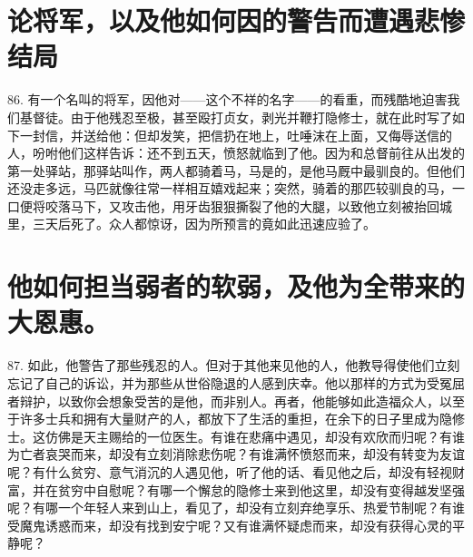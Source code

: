 
\section{论将军，以及他如何因的警告而遭遇悲惨结局}

86. 有一个名叫的将军，因他对——这个不祥的名字——的看重，而残酷地迫害我们基督徒。由于他残忍至极，甚至殴打贞女，剥光并鞭打隐修士，就在此时写了如下一封信，并送给他：但却发笑，把信扔在地上，吐唾沫在上面，又侮辱送信的人，吩咐他们这样告诉：还不到五天，愤怒就临到了他。因为和总督前往从出发的第一处驿站，那驿站叫作，两人都骑着马，马是的，是他马厩中最驯良的。但他们还没走多远，马匹就像往常一样相互嬉戏起来；突然，骑着的那匹较驯良的马，一口便将咬落马下，又攻击他，用牙齿狠狠撕裂了他的大腿，以致他立刻被抬回城里，三天后死了。众人都惊讶，因为所预言的竟如此迅速应验了。\par


\section{他如何担当弱者的软弱，及他为全带来的大恩惠。}

87. 如此，他警告了那些残忍的人。但对于其他来见他的人，他教导得使他们立刻忘记了自己的诉讼，并为那些从世俗隐退的人感到庆幸。他以那样的方式为受冤屈者辩护，以致你会想象受苦的是他，而非别人。再者，他能够如此造福众人，以至于许多士兵和拥有大量财产的人，都放下了生活的重担，在余下的日子里成为隐修士。这仿佛是天主赐给的一位医生。有谁在悲痛中遇见，却没有欢欣而归呢？有谁为亡者哀哭而来，却没有立刻消除悲伤呢？有谁满怀愤怒而来，却没有转变为友谊呢？有什么贫穷、意气消沉的人遇见他，听了他的话、看见他之后，却没有轻视财富，并在贫穷中自慰呢？有哪一个懈怠的隐修士来到他这里，却没有变得越发坚强呢？有哪一个年轻人来到山上，看见了，却没有立刻弃绝享乐、热爱节制呢？有谁受魔鬼诱惑而来，却没有找到安宁呢？又有谁满怀疑虑而来，却没有获得心灵的平静呢？\par

